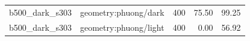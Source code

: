 \begin{longtable}{l>{\raggedright\arraybackslash}p{.42\linewidth}rrr}
b500\_\allowbreak{}dark\_\allowbreak{}s303 & %
geometry:phuong/dark & %
400 & %
75.50 & %
99.25 \\ %

b500\_\allowbreak{}dark\_\allowbreak{}s303 & %
geometry:phuong/light & %
400 & %
0.00 & %
56.92 \\ %


\end{longtable}
